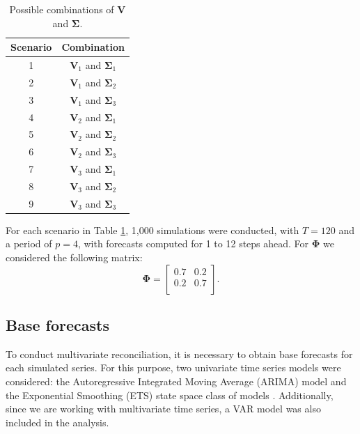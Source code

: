 \documentclass[a4paper,preprint,11pt,authoryear]{elsarticle}
\begin{document}
\begin{table}[!hbt]
  \centering
  \begin{tabular}{cc}
    \hline
    \textbf{Scenario} & \textbf{Combination} \\
    \hline
    1 & $\bm{V}_1$ and $\bm{\Sigma}_1$ \\
    2 & $\bm{V}_1$ and $\bm{\Sigma}_2$ \\
    3 & $\bm{V}_1$ and $\bm{\Sigma}_3$ \\
    4 & $\bm{V}_2$ and $\bm{\Sigma}_1$ \\
    5 & $\bm{V}_2$ and $\bm{\Sigma}_2$ \\
    6 & $\bm{V}_2$ and $\bm{\Sigma}_3$ \\
    7 & $\bm{V}_3$ and $\bm{\Sigma}_1$ \\
    8 & $\bm{V}_3$ and $\bm{\Sigma}_2$ \\
    9 & $\bm{V}_3$ and $\bm{\Sigma}_3$ \\
    \hline
  \end{tabular}
  \caption{Possible combinations of $\bm{V}$ and $\bm{\Sigma}$.}
  \label{tab:v_sigma}
\end{table}

For each scenario in Table \ref{tab:v_sigma}, 1,000 simulations were conducted, with $T = 120$ and a period of $p = 4$, with forecasts computed for 1 to 12 steps ahead. For $\bm{\Phi}$ we considered the following matrix:
\begin{equation*}
  \bm{\Phi} =
  \begin{bmatrix}
    0.7 & 0.2 \\
    0.2 & 0.7 \\
  \end{bmatrix}.
\end{equation*}

\subsection{Base forecasts}
\label{sec3.2}

To conduct multivariate reconciliation, it is necessary to obtain base forecasts for each simulated series. For this purpose, two univariate time series models were considered: the Autoregressive Integrated Moving Average (ARIMA) model and the Exponential Smoothing (ETS) state space class of models \citep{hyndman2008automatic,hyndman2021forecasting}. Additionally, since we are working with multivariate time series, a VAR model \citep{sims1980macroeconomics} was also included in the analysis.
\end{document}
